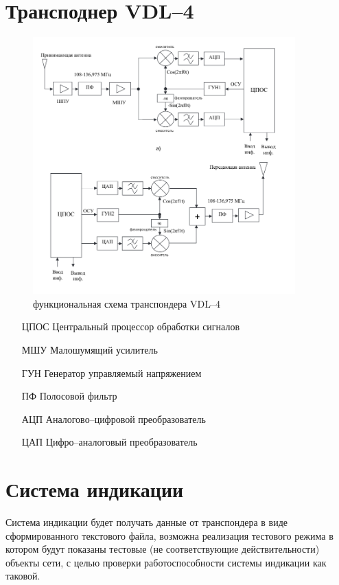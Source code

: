 \documentclass[a4paper,12pt]{report} %
\begin{document}
\section{Трансподнер VDL--4}

\begin{figure}[!ht]
  \includegraphics[width=0.9\textwidth]{vdl4}
  \caption{функциональная схема транспондера VDL--4}
\end{figure}

\begin{itemize}
\item [ЦПОС] Центральный процессор обработки сигналов
\item [МШУ] Малошумящий усилитель
\item [ГУН] Генератор управляемый напряжением
\item [ПФ] Полосовой фильтр
\item [АЦП] Аналогово--цифровой преобразователь
\item [ЦАП] Цифро--аналоговый преобразователь
\end{itemize}
\newpage

\section{Система индикации}

Система индикации будет получать данные от транспондера в виде сформированного
текстового файла, возможна реализация тестового режима в котором будут показаны
тестовые (не соответствующие действительности) объекты сети, с целью проверки
работоспособности системы индикации как таковой.
\end{document}

